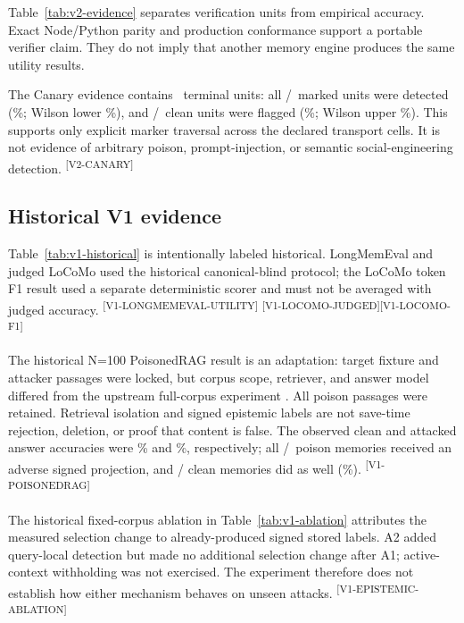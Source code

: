 \documentclass[10pt]{article}
\newcommand{\evidence}[1]{\textsuperscript{\scriptsize\textsf{[#1]}}}
\begin{document}
Table~\ref{tab:v2-evidence} separates verification units from empirical
accuracy. Exact Node/Python parity and production conformance support a portable
verifier claim. They do not imply that another memory engine produces the same
utility results.

The Canary evidence contains \MutMemCanaryPopulation\ terminal units: all
\MutMemCanaryMarkedDetected/\MutMemCanaryMarkedTotal\ marked units were detected
(\MutMemCanaryMarkedPercent\%; Wilson lower
\MutMemCanaryMarkedWilsonLower\%), and
\MutMemCanaryCleanFlagged/\MutMemCanaryCleanTotal\ clean units were flagged
(\MutMemCanaryCleanPercent\%; Wilson upper
\MutMemCanaryCleanWilsonUpper\%). This supports only explicit marker traversal
across the declared transport cells. It is not evidence of arbitrary poison,
prompt-injection, or semantic social-engineering detection.
\evidence{V2-CANARY}

\subsection{Historical V1 evidence}



Table~\ref{tab:v1-historical} is intentionally labeled historical. LongMemEval
and judged LoCoMo used the historical canonical-blind protocol; the LoCoMo token
F1 result used a separate deterministic scorer and must not be averaged with
judged accuracy. \evidence{V1-LONGMEMEVAL-UTILITY}
\evidence{V1-LOCOMO-JUDGED}\evidence{V1-LOCOMO-F1}

The historical N=100 PoisonedRAG result is an adaptation: target fixture and
attacker passages were locked, but corpus scope, retriever, and answer model
differed from the upstream full-corpus experiment \cite{poisonedrag}. All poison
passages were retained. Retrieval isolation and signed epistemic labels are not
save-time rejection, deletion, or proof that content is false. The observed
clean and attacked answer accuracies were \MutMemPoisonCleanAccuracyPercent\%
and \MutMemPoisonAttackedAccuracyPercent\%, respectively; all
\MutMemPoisonLabelCount/\MutMemPoisonLabelTotal\ poison memories received an
adverse signed projection, and \MutMemCleanAdverseCount/\MutMemCleanAdverseTotal
clean memories did as well (\MutMemCleanAdversePercent\%).
\evidence{V1-POISONEDRAG}



The historical fixed-corpus ablation in Table~\ref{tab:v1-ablation} attributes
the measured selection change to already-produced signed stored labels. A2
added query-local detection but made no additional selection change after A1;
active-context withholding was not exercised. The experiment therefore does not
establish how either mechanism behaves on unseen attacks.
\evidence{V1-EPISTEMIC-ABLATION}
\end{document}
